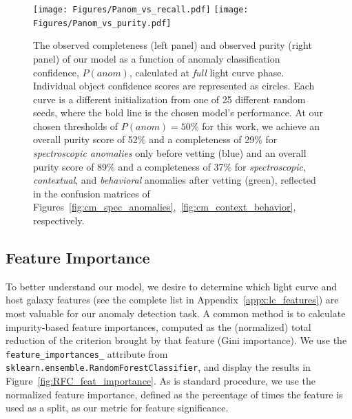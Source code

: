 \documentclass[twocolumn]{aastex63}
\begin{document}
\begin{figure}
    \centering
    \texttt{[image: Figures/Panom\_vs\_recall.pdf]}
    \texttt{[image: Figures/Panom\_vs\_purity.pdf]}
    \caption{
    The observed completeness (left panel) and observed purity (right panel) of our model as a function of anomaly classification confidence, $P(anom)$, calculated at \emph{full} light curve phase. Individual object confidence scores are represented as circles. Each curve is a different initialization from one of 25 different random seeds, where the bold line is the chosen model's performance. At our chosen thresholds of $P(anom)=50\%$ for this work, we achieve an overall purity score of 52\% and a completeness of 29\% for \emph{spectroscopic anomalies} only before vetting (blue) and an overall purity score of 89\% and a completeness of 37\% for \emph{spectroscopic}, \emph{contextual}, and \emph{behavioral} anomalies after vetting (green), reflected in the confusion matrices of Figures~\ref{fig:cm_spec_anomalies},~\ref{fig:cm_context_behavior}, respectively.
    } 
    \label{fig:Panom_vs_PR}
\end{figure}

\subsection{Feature Importance} \label{subsec:feature_importance}

To better understand our model, we desire to determine which light curve and host galaxy features (see the complete list in Appendix~\ref{appx:lc_features}) are most valuable for our anomaly detection task. A common method is to calculate impurity-based feature importances, computed as the (normalized) total reduction of the criterion brought by that feature (Gini importance). We use the \texttt{feature\_importances\_} attribute from \texttt{sklearn.ensemble.RandomForestClassifier}, and display the results in Figure~\ref{fig:RFC_feat_importance}. As is standard procedure, we use the normalized feature importance, defined as the percentage of times the feature is used as a split, as our metric for feature significance. \par
\end{document}
